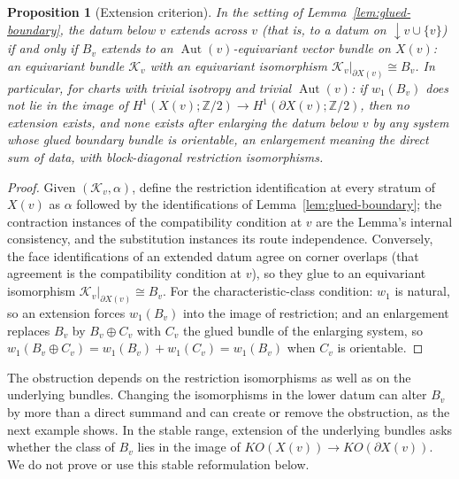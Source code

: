 \documentclass[11pt,letterpaper,twoside]{article}
\theoremstyle{plain}
\newtheorem{proposition}[theorem]{Proposition}
\theoremstyle{definition}
\theoremstyle{remark}
\newcommand{\below}[1]{{\downarrow}#1}
\begin{document}
\begin{proposition}[Extension criterion]\label{prop:extension-criterion}
In the setting of Lemma~\ref{lem:glued-boundary}, the datum below \(v\) extends across \(v\) (that is, to a datum on \(\below{v}\cup\{v\}\)) if and only if \(B_v\) extends to an \(\operatorname{Aut}(v)\)-equivariant vector bundle on \(X(v)\): an equivariant bundle \(\mathcal K_v\) with an equivariant isomorphism \(\mathcal K_v|_{\partial X(v)}\cong B_v\).  In particular, for charts with trivial isotropy and trivial \(\operatorname{Aut}(v)\): if \(w_1(B_v)\) does not lie in the image of \(H^1(X(v);\mathbb Z/2)\to H^1(\partial X(v);\mathbb Z/2)\), then no extension exists, and none exists after enlarging the datum below \(v\) by any system whose glued boundary bundle is orientable, an enlargement meaning the direct sum of data, with block-diagonal restriction isomorphisms.
\end{proposition}

\begin{proof}
Given \((\mathcal K_v,\alpha)\), define the restriction identification at every stratum of \(X(v)\) as \(\alpha\) followed by the identifications of Lemma~\ref{lem:glued-boundary}; the contraction instances of the compatibility condition at \(v\) are the Lemma's internal consistency, and the substitution instances its route independence.  Conversely, the face identifications of an extended datum agree on corner overlaps (that agreement is the compatibility condition at \(v\)), so they glue to an equivariant isomorphism \(\mathcal K_v|_{\partial X(v)}\cong B_v\).  For the characteristic-class condition: \(w_1\) is natural, so an extension forces \(w_1(B_v)\) into the image of restriction; and an enlargement replaces \(B_v\) by \(B_v\oplus C_v\) with \(C_v\) the glued bundle of the enlarging system, so \(w_1(B_v\oplus C_v)=w_1(B_v)+w_1(C_v)=w_1(B_v)\) when \(C_v\) is orientable.
\end{proof}

The obstruction depends on the restriction isomorphisms as well as on the underlying bundles.  Changing the isomorphisms in the lower datum can alter \(B_v\) by more than a direct summand and can create or remove the obstruction, as the next example shows.  In the stable range, extension of the underlying bundles asks whether the class of \(B_v\) lies in the image of \(KO(X(v))\to KO(\partial X(v))\).  We do not prove or use this stable reformulation below.
\end{document}
